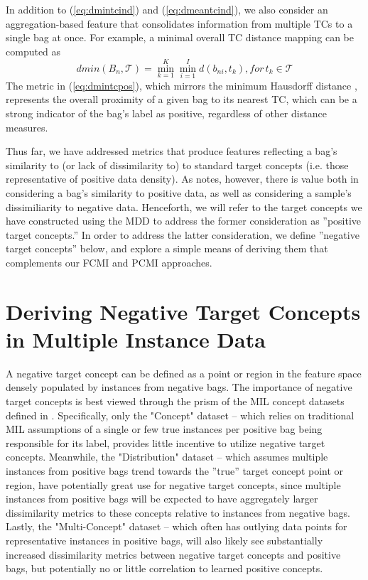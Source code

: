 \documentclass[12pt,dvips]{report}
\numberwithin{equation}{section}
\begin{document}
In addition to (\ref{eq:dmintcind}) and (\ref{eq:dmeantcind}), we also consider an aggregation-based feature that consolidates information from multiple TCs to a single bag at once.  For example, a minimal overall TC distance mapping can be computed as
\begin{equation} \label{eq:dmintcpos}
dmin(B_{n},\mathcal{T}) = \min_{k=1}^{{K}}\min_{i=1}^{I} d(b_{ni},t_{k}), for \, t_{k} \in \mathcal{T}
\end{equation}
The metric in (\ref{eq:dmintcpos}), which mirrors the minimum Hausdorff distance \cite{chap14}, represents the overall proximity of a given bag to its nearest TC, which can be a strong indicator of the bag's label as positive, regardless of other distance measures.

Thus far, we have addressed metrics that produce features reflecting a bag's similarity to (or lack of dissimilarity to) to standard target concepts (i.e. those representative of positive data density).   As \cite{chap14} notes, however, there is value both in considering a bag's similarity to positive data, as well as considering a sample's dissimiliarity to negative data.  Henceforth, we will refer to the target concepts we have constructed using the MDD to address the former consideration as ''positive target concepts.'' In order to address the latter consideration, we define ''negative target concepts'' below, and explore a simple means of deriving them that complements our FCMI and PCMI approaches.  

\section{Deriving Negative Target Concepts in Multiple Instance Data} %

A negative target concept can be defined as a point or region in the feature space densely populated by instances from negative bags.  The importance of negative target concepts is best viewed through the prism of the MIL concept datasets defined in \cite{chap14}.  Specifically, only the "Concept" dataset -- which relies on traditional MIL assumptions of a single or few true instances per positive bag being responsible for its label, provides little incentive to utilize negative target concepts.  Meanwhile, the "Distribution" dataset -- which assumes multiple instances from positive bags trend towards the ''true'' target concept point or region, have potentially great use for negative target concepts, since multiple instances from positive bags will be expected to have aggregately larger dissimilarity metrics to these concepts relative to instances from negative bags.  Lastly, the "Multi-Concept" dataset -- which often has outlying data points for representative instances in positive bags, will also likely see substantially increased dissimilarity metrics between negative target concepts and positive bags, but potentially no or little correlation to learned positive concepts.
\end{document}
